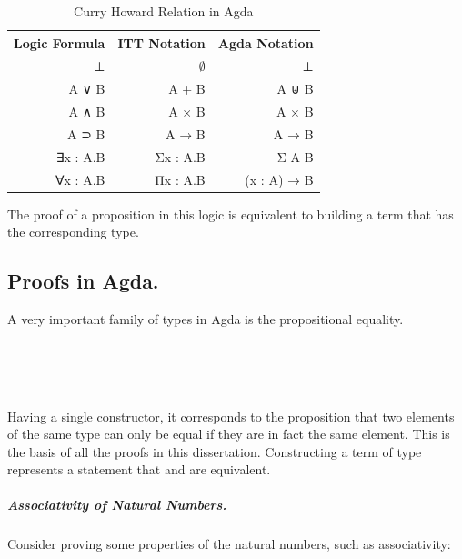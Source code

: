 \documentclass[12pt,twoside,notitlepage]{report}
\begin{document}
\begin{table}[h!]
\centering
	\begin{tabular}{r r r} 
	\hline 
	Logic Formula & ITT Notation & Agda Notation \\
	\hline
	⊥  & $∅$  & ⊥ \\
	A ∨ B & A + B &   A ⊎ B \\
	A ∧ B & A × B &   A × B \\
	A ⊃ B & A → B &   A → B \\ 
	∃x : A.B & Σx : A.B & Σ A B \\
	∀x : A.B & Πx : A.B & (x : A) →  B\\ 
	\hline
	\end{tabular}
\caption{Curry Howard Relation in Agda}
\end{table} 

The proof of a proposition in this logic is equivalent to building a term that has the corresponding type.

\subsection{Proofs in Agda.}

A very important family of types in Agda is the propositional equality.

\begin{code}
\\
\>  \AgdaSymbol{\{}\AgdaSymbol{\}} \AgdaSymbol{\{} \AgdaSymbol{:}  \AgdaSymbol{\}} \AgdaSymbol{(} \AgdaSymbol{:} \AgdaSymbol{)} \AgdaSymbol{:}     \<%
\\
\>[0]\<[2]%
\>[2] \AgdaSymbol{:}   \<%
\\
\end{code}
Having a single constructor, it corresponds to the proposition that two elements of the same type can only be equal if they are in fact the same element. 
This is the basis of all the proofs in this dissertation. Constructing a term of type    represents a statement that  and  are equivalent.

\subparagraph{Associativity of Natural Numbers.}
Consider proving some properties of the natural numbers, such as associativity: \\
\end{document}
